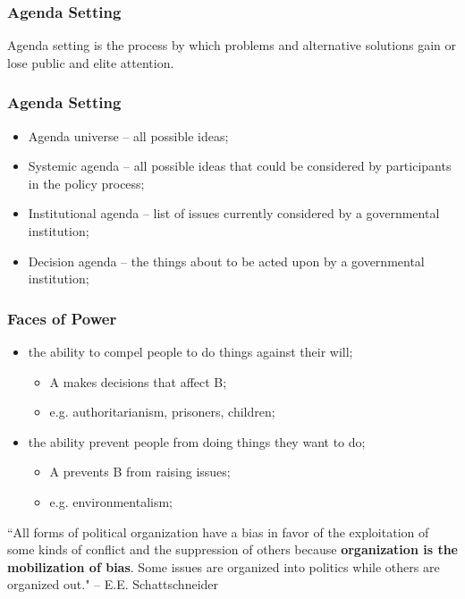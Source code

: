 \documentclass[aspectratio=169]{beamer}
\theoremstyle{principle}
\begin{document}
\begin{frame}
\frametitle{Agenda Setting}
\begin{center}
\Large Agenda setting is the process by which problems and alternative solutions gain or lose public and elite attention.
\end{center}
\end{frame}

\begin{frame}
\frametitle{Agenda Setting}
\begin{itemize}
\item Agenda universe -- all possible ideas;
\bigskip
\bigskip
\item Systemic agenda -- all possible ideas that could be considered by participants in the policy process;
\bigskip
\bigskip
\item Institutional agenda -- list of issues currently considered by a governmental institution;
\bigskip
\bigskip
\item Decision agenda -- the things about to be acted upon by a governmental institution;
\end{itemize}
\end{frame}

\begin{frame}
\frametitle{Faces of Power}
\begin{itemize}
\item the ability to compel people to do things against their will;
\begin{itemize}
\item A makes decisions that affect B;
\item e.g. authoritarianism, prisoners, children;
\end{itemize}
\bigskip
\item the ability prevent people from doing things they want to do;
\begin{itemize}
\item A prevents B from raising issues;
\item e.g. environmentalism;
\end{itemize}
\end{itemize}
\bigskip
``All forms of political organization have a bias in favor of the exploitation of some kinds of conflict and the suppression of others because \textbf{organization is the mobilization of bias}. Some issues are organized into politics while others are organized out." -- E.E. Schattschneider

\end{frame}
\end{document}
